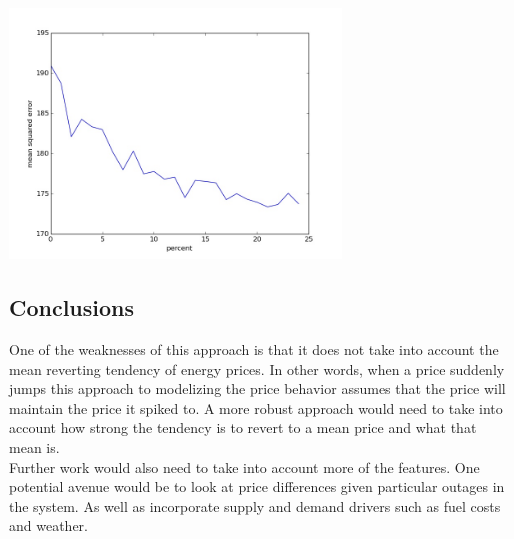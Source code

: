 \documentclass{report}
\begin{document}
\begin{center}
\includegraphics[width=250pt, keepaspectratio=true]{outlier_error.jpg}
\end{center}
\subsection*{Conclusions}

One of the weaknesses of this approach is that it does not take into account the
mean reverting tendency of energy prices. In other words, when a price suddenly
jumps this approach to modelizing the price behavior assumes that the price will
maintain the price it spiked to. A more robust approach would need to take into account
how strong the tendency is to revert to a mean price and what that mean is.\\

Further work would also need to take into account more of the features. One potential
avenue would be to look at price differences given particular outages in the system.
As well as incorporate supply and demand drivers such as fuel costs and weather.

\nocite{*}


\end{document}
